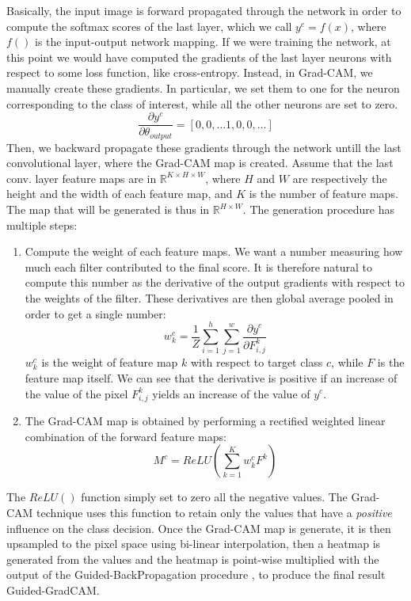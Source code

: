 \documentclass[../main.tex]{subfiles}
\begin{document}
    Basically, the input image is forward propagated through the network in order to compute the softmax scores
    of the last layer, which we call $y^{c} = f(x)$, where $f()$ is the input-output network mapping.
    If we were training the network, at this point we would have computed the gradients of the
    last layer neurons with respect to some loss function, like cross-entropy. Instead, in Grad-CAM, we manually
    create these gradients. In particular, we set them to one for the neuron corresponding to the class of interest,
    while all the other neurons are set to zero.
    $$ \frac{\partial y^{c}}{\partial \theta_{output}} = [0, 0, \ldots 1, 0, 0, \ldots] $$
    Then, we backward propagate these gradients through the network untill
    the last convolutional layer, where the Grad-CAM map is created. Assume that the last conv. layer feature maps are
    in $ \mathbb{R}^{K \times H \times W} $, where $H$ and $W$ are respectively the height and the width of each feature
    map, and $K$ is the number of feature maps. The map that will be generated is thus in $\mathbb{R}^{H \times W}$.
    The generation procedure has multiple steps:
    \begin{enumerate}
        \item Compute the weight of each feature maps. We want a number measuring how much each filter contributed to
            the final score. It is therefore natural to compute this number as the derivative of the output gradients
            with respect to the weights of the filter. These derivatives are then global average pooled in order to get
            a single number:
            \begin{equation}
                w_{k}^{c} = \frac{1}{Z} \sum_{i = 1}^{h} \sum_{j = 1}^{w} \frac{\partial y^{c}}{\partial F_{i, j}^{k}}
            \end{equation}
            $w_{k}^{c}$ is the weight of feature map $k$ with respect to target class $c$, while $F$ is the feature map
            itself. We can see that the derivative is positive if an increase of the value of the pixel $F_{i, j}^{k}$ yields
            an increase of the value of $y^{c}$.
        \item The Grad-CAM map is obtained by performing a rectified weighted linear combination of the forward feature maps:
            \begin{equation}
                M^{c} = ReLU \left( \sum_{k = 1}^{K} w_{k}^{c} F^{k} \right)
            \end{equation}
    \end{enumerate}
    The $ReLU()$ function simply set to zero all the negative values. The Grad-CAM technique uses this function to retain only
    the values that have a \textit{positive} influence on the class decision.
    Once the Grad-CAM map is generate, it is then upsampled to the pixel space using bi-linear interpolation, then a heatmap
    is generated from the values and the heatmap is point-wise multiplied with the output of the Guided-BackPropagation procedure
	\cite{guidedbackprop}, to produce the final result Guided-GradCAM.
\end{document}
